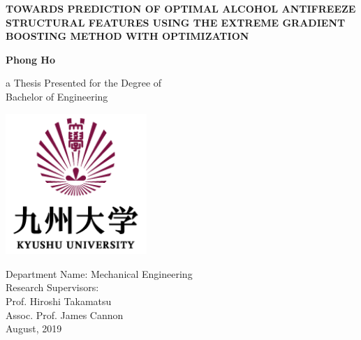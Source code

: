 \begin{titlepage} %
    \renewcommand{\baselinestretch}{1.5}
    \begin{center}
        \vspace*{0.5cm}
 
        \large
        \textbf{TOWARDS PREDICTION OF OPTIMAL ALCOHOL ANTIFREEZE STRUCTURAL 
        FEATURES USING THE EXTREME GRADIENT BOOSTING METHOD WITH OPTIMIZATION}
 
 
        \vspace{0.5cm}
        \Large
        \textbf{Phong Ho}
 
        \vspace{0.5cm}

        \Large
 
        a Thesis Presented for the Degree of\\
        Bachelor of Engineering
 
        \vfill
 
        \includegraphics[width=0.4\textwidth]{qlogo.png}
        \vfill
 
        \large
        Department Name: Mechanical Engineering\\
        Research Supervisors:\\
        Prof. Hiroshi Takamatsu\\
        Assoc. Prof. James Cannon\\
        August, 2019
 
    \end{center}
\end{titlepage}